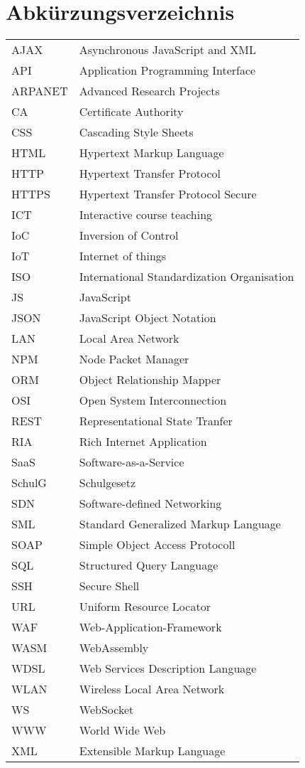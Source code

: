 \section*{Abkürzungsverzeichnis}

\begin{tabularx}{0.9\columnwidth}{lX}
	AJAX & Asynchronous JavaScript and XML \\
	API & Application Programming Interface \\
	ARPANET & Advanced Research Projects \\
	CA & Certificate Authority \\
	CSS & Cascading Style Sheets \\
	HTML & Hypertext Markup Language \\ 
	HTTP & Hypertext Transfer Protocol \\
	HTTPS & Hypertext Transfer Protocol Secure \\
	ICT & Interactive course teaching \\
	IoC & Inversion of Control \\
	IoT & Internet of things \\ 
	ISO & International Standardization Organisation \\
	JS & JavaScript \\
	JSON & JavaScript Object Notation \\
	LAN & Local Area Network \\
	NPM & Node Packet Manager \\
	ORM & Object Relationship Mapper \\
	OSI & Open System Interconnection \\
	REST & Representational State Tranfer \\
	RIA & Rich Internet Application \\
	SaaS & Software-as-a-Service \\
	SchulG & Schulgesetz \\
	SDN & Software-defined Networking \\
	SML & Standard Generalized Markup Language \\
	SOAP & Simple Object Access Protocoll \\
	SQL & Structured Query Language \\
	SSH & Secure Shell \\
	URL & Uniform Resource Locator \\
	WAF & Web-Application-Framework \\
	WASM & WebAssembly \\
	WDSL & Web Services Description Language \\
	WLAN & Wireless Local Area Network \\
	WS & WebSocket \\ 
	WWW & World Wide Web \\
	XML & Extensible Markup Language \\
\end{tabularx}



